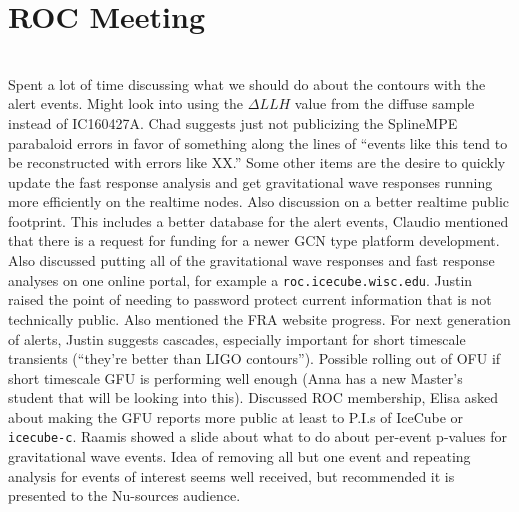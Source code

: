\section*{ROC Meeting}  

\\

Spent a lot of time discussing what we should do about the contours with the alert events. Might look into using the $\Delta LLH$ value from the diffuse sample instead of IC160427A. Chad suggests just not publicizing the SplineMPE parabaloid errors in favor of something along the lines of ``events like this tend to be reconstructed with errors like XX.'' Some other items are the desire to quickly update the fast response analysis and get gravitational wave responses running more efficiently on the realtime nodes. Also discussion on a better realtime public footprint. This includes a better database for the alert events, Claudio mentioned that there is a request for funding for a newer GCN type platform development. Also discussed putting all of the gravitational wave responses and fast response analyses on one online portal, for example a \texttt{roc.icecube.wisc.edu}. Justin raised the point of needing to password protect current information that is not technically public. Also mentioned the FRA website progress. For next generation of alerts, Justin suggests cascades, especially important for short timescale transients (``they're better than LIGO contours''). Possible rolling out of OFU if short timescale GFU is performing well enough (Anna has a new Master's student that will be looking into this). Discussed ROC membership, Elisa asked about making the GFU reports more public at least to P.I.s of IceCube or \texttt{icecube-c}. Raamis showed a slide about what to do about per-event p-values for gravitational wave events. Idea of removing all but one event and repeating analysis for events of interest seems well received, but recommended it is presented to the Nu-sources audience.


